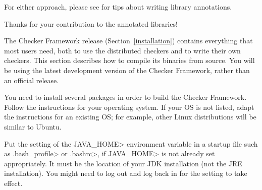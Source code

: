 For either approach, please see  for
tips about writing library annotations.

Thanks for your contribution to the annotated libraries!



The Checker Framework release (Section~\ref{installation}) contains
everything that most users need, both to use the distributed checkers and
to write their own checkers.  This section describes how to compile its
binaries from source.  You will be using the latest development version of
the Checker Framework, rather than an official release.




You need to install several packages in order to build the Checker
Framework.
Follow the instructions for your operating system.
If your OS is not listed, adapt the instructions for an existing OS;
for example, other Linux distributions will be similar to Ubuntu.

Put the setting of the \<JAVA\_HOME> environment variable in a startup file
such as \<.bash\_profile> or \<.bashrc>, if \<JAVA\_HOME> is not already
set appropriately.  It must be the location of your JDK
installation (not the JRE installation).
You might need to log out and log back in for the setting to take effect.

